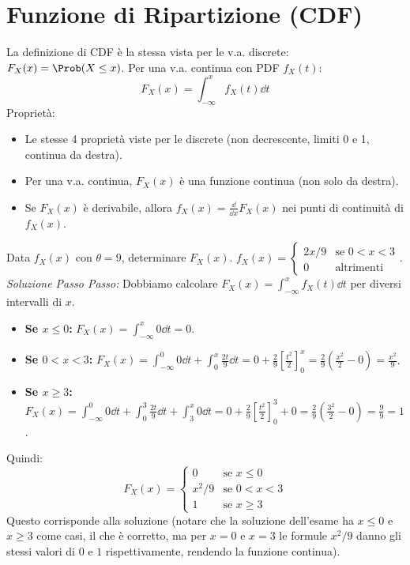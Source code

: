 \section{Funzione di Ripartizione (CDF)}
La definizione di CDF è la stessa vista per le v.a. discrete: $F_X(x) = \Prob(X \le x)$.
Per una v.a. continua con PDF $f_X(t)$:
\[ F_X(x) = \int_{-\infty}^x f_X(t) \dd t \]
Proprietà:
\begin{itemize}
    \item Le stesse 4 proprietà viste per le discrete (non decrescente, limiti 0 e 1, continua da destra).
    \item Per una v.a. continua, $F_X(x)$ è una funzione continua (non solo da destra).
    \item Se $F_X(x)$ è derivabile, allora $f_X(x) = \frac{\dd}{\dd x} F_X(x)$ nei punti di continuità di $f_X(x)$.
\end{itemize}

\begin{example}
Data $f_X(x)$ con $\theta=9$, determinare $F_X(x)$.
$f_X(x) = \begin{cases} 2x/9 & \text{se } 0 < x < 3 \\ 0 & \text{altrimenti} \end{cases}$.
\textit{Soluzione Passo Passo:}
Dobbiamo calcolare $F_X(x) = \int_{-\infty}^x f_X(t) \dd t$ per diversi intervalli di $x$.
\begin{itemize}
    \item \textbf{Se $x \le 0$:}
    $F_X(x) = \int_{-\infty}^x 0 \dd t = 0$.
    \item \textbf{Se $0 < x < 3$:}
    $F_X(x) = \int_{-\infty}^0 0 \dd t + \int_0^x \frac{2t}{9} \dd t = 0 + \frac{2}{9} \left[ \frac{t^2}{2} \right]_0^x = \frac{2}{9} \left( \frac{x^2}{2} - 0 \right) = \frac{x^2}{9}$.
    \item \textbf{Se $x \ge 3$:}
    $F_X(x) = \int_{-\infty}^0 0 \dd t + \int_0^3 \frac{2t}{9} \dd t + \int_3^x 0 \dd t = 0 + \frac{2}{9} \left[ \frac{t^2}{2} \right]_0^3 + 0 = \frac{2}{9} \left( \frac{3^2}{2} - 0 \right) = \frac{9}{9} = 1$.
\end{itemize}
Quindi:
\[ F_X(x) = \begin{cases} 0 & \text{se } x \le 0 \\ x^2/9 & \text{se } 0 < x < 3 \\ 1 & \text{se } x \ge 3 \end{cases} \]
Questo corrisponde alla soluzione (notare che la soluzione dell'esame ha $x \le 0$ e $x \ge 3$ come casi, il che è corretto, ma per $x=0$ e $x=3$ le formule $x^2/9$ danno gli stessi valori di $0$ e $1$ rispettivamente, rendendo la funzione continua).
\end{example}

